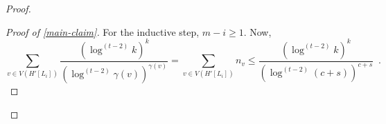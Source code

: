 \documentclass[kpfonts]{patmorin}
\theoremstyle{named}
\begin{document}
\begin{proof}
\begin{proof}[Proof of \cref{main-claim}]
        For the inductive step, $m-i\ge 1$.
        Now,
        \[
            \sum_{v\in V(H'[L_i])}\frac{(\log^{(t-2)} k)^k}{(\log^{(t-2)} \gamma(v))^{\gamma(v)}}
            = \sum_{v\in V(H'[L_i])} n_v
            \le \frac{(\log^{(t-2)} k)^k}{(\log^{(t-2)} (c+s))^{c+s}} \enspace .
        \]

\end{proof}
\end{proof}
\end{document}

